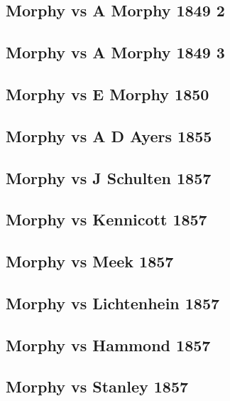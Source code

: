 \documentclass[]{book}
\begin{document}
\subsection{Morphy vs A Morphy 1849 2}\label{morphy-vs-a-morphy-1849-2}

\subsection{Morphy vs A Morphy 1849 3}\label{morphy-vs-a-morphy-1849-3}

\subsection{Morphy vs E Morphy 1850}\label{morphy-vs-e-morphy-1850}

\subsection{Morphy vs A D Ayers 1855}\label{morphy-vs-a-d-ayers-1855}

\subsection{Morphy vs J Schulten 1857}\label{morphy-vs-j-schulten-1857}

\subsection{Morphy vs Kennicott 1857}\label{morphy-vs-kennicott-1857}

\subsection{Morphy vs Meek 1857}\label{morphy-vs-meek-1857}

\subsection{Morphy vs Lichtenhein
1857}\label{morphy-vs-lichtenhein-1857}

\subsection{Morphy vs Hammond 1857}\label{morphy-vs-hammond-1857}

\subsection{Morphy vs Stanley 1857}\label{morphy-vs-stanley-1857}
\end{document}
